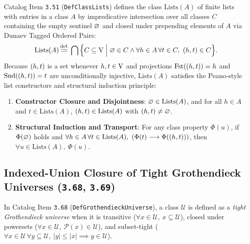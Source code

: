 Catalog Item \texttt{3.51} (\texttt{DefClassLists}) defines the class $\mathrm{Lists}(A)$ of finite lists with entries in a class $A$ by impredicative intersection over all classes $C$ containing the empty sentinel $\varnothing$ and closed under prepending elements of $A$ via Dunaev Tagged Ordered Pairs:
\[
\mathrm{Lists}(A) \,{\stackrel{{\textrm{def.}}}{\coloneqq}}\, \bigcap \Big\{ C \subseteq \mathrm{V} \;\Big|\; \varnothing \in C \land \forall h \in A\,\forall t \in C,\ (h,t) \in C \Big\}.
\]
Because $(h,t)$ is a set whenever $h, t \in \mathrm{V}$ and projections $\operatorname{Fst}((h,t)) = h$ and $\operatorname{Snd}((h,t)) = t$ are unconditionally injective, $\mathrm{Lists}(A)$ satisfies the Peano-style list constructors and structural induction principle:
\begin{enumerate}
  \item \textbf{Constructor Closure and Disjointness}: $\varnothing \in \mathrm{Lists}(A)$, and for all $h \in A$ and $t \in \mathrm{Lists}(A)$, $(h,t) \in \mathrm{Lists}(A)$ with $(h,t) \neq \varnothing$.
  \item \textbf{Structural Induction and Transport}: For any class property $\Phi(u)$, if $\Phi(\varnothing)$ holds and $\forall h \in A\,\forall t \in \mathrm{Lists}(A),\ (\Phi(t) \implies \Phi(\pair{h}{t}))$, then $\forall u \in \mathrm{Lists}(A),\ \Phi(u)$.
\end{enumerate}

\subsection{Indexed-Union Closure of Tight Grothendieck Universes (\texttt{3.68}, \texttt{3.69})}
\label{subsec:tight_universe_indexed_union}

In Catalog Item \texttt{3.68} (\texttt{DefGrothendieckUniverse}), a class $\mathcal{U}$ is defined as a \emph{tight Grothendieck universe} when it is transitive ($\forall x \in \mathcal{U},\ x \subseteq \mathcal{U}$), closed under powersets ($\forall x \in \mathcal{U},\ \mathcal{P}(x) \in \mathcal{U}$), and subset-tight ($\forall x \in \mathcal{U}\,\forall y \subseteq \mathcal{U},\ |y| \le |x| \implies y \in \mathcal{U}$).

